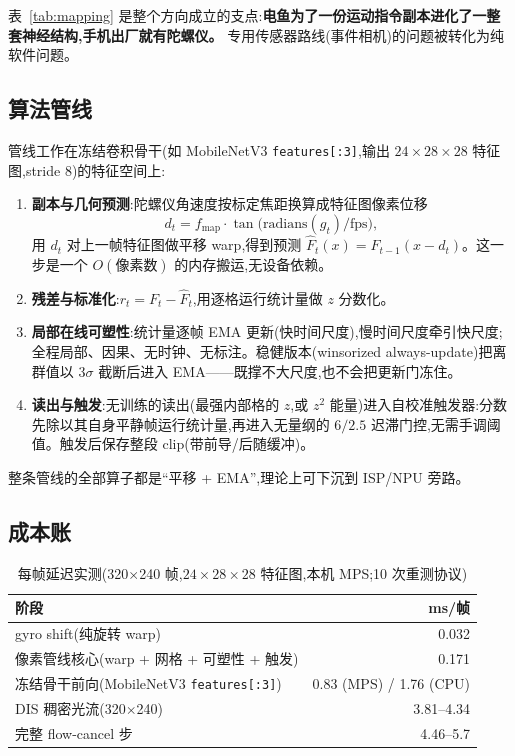 \documentclass[UTF8,12pt,a4paper]{ctexart}
\begin{document}
表~\ref{tab:mapping} 是整个方向成立的支点:\textbf{电鱼为了一份运动指令副本进化了一整套神经结构,手机出厂就有陀螺仪。} 专用传感器路线(事件相机)的问题被转化为纯软件问题。

\subsection{算法管线}

管线工作在冻结卷积骨干(如 MobileNetV3\cite{mobilenetv3} \texttt{features[:3]},输出 $24{\times}28{\times}28$ 特征图,stride 8)的特征空间上:

\begin{enumerate}
  \item \textbf{副本与几何预测}:陀螺仪角速度按标定焦距换算成特征图像素位移
  \begin{equation}
    d_t = f_{\mathrm{map}} \cdot \tan\!\big(\mathrm{radians}(g_t) / \mathrm{fps}\big),
  \end{equation}
  用 $d_t$ 对上一帧特征图做平移 warp,得到预测 $\hat F_t(x) = F_{t-1}(x - d_t)$。这一步是一个 $O(\text{像素数})$ 的内存搬运,无设备依赖。
  \item \textbf{残差与标准化}:$r_t = F_t - \hat F_t$,用逐格运行统计量做 $z$ 分数化。
  \item \textbf{局部在线可塑性}:统计量逐帧 EMA 更新(快时间尺度),慢时间尺度牵引快尺度;全程局部、因果、无时钟、无标注。稳健版本(winsorized always-update)把离群值以 $3\sigma$ 截断后进入 EMA——既撑不大尺度,也不会把更新门冻住。
  \item \textbf{读出与触发}:无训练的读出(最强内部格的 $z$,或 $z^2$ 能量)进入自校准触发器:分数先除以其自身平静帧运行统计量,再进入无量纲的 $6/2.5$ 迟滞门控,无需手调阈值。触发后保存整段 clip(带前导/后随缓冲)。
\end{enumerate}

整条管线的全部算子都是``平移 + EMA'',理论上可下沉到 ISP/NPU 旁路。

\subsection{成本账}

\begin{table}[htbp]
  \centering
  \small
  \caption{每帧延迟实测(320$\times$240 帧,$24{\times}28{\times}28$ 特征图,本机 MPS;10 次重测协议)}
  \label{tab:cost}
  \begin{tabular}{lr}
    \toprule
    阶段 & ms/帧 \\
    \midrule
    gyro shift(纯旋转 warp) & 0.032 \\
    像素管线核心(warp + 网格 + 可塑性 + 触发) & 0.171 \\
    冻结骨干前向(MobileNetV3 \texttt{features[:3]}) & 0.83 (MPS) / 1.76 (CPU) \\
    DIS 稠密光流(320$\times$240)\cite{dis2016} & 3.81--4.34 \\
    完整 flow-cancel 步 & 4.46--5.7 \\
    \bottomrule
  \end{tabular}
\end{table}
\end{document}
